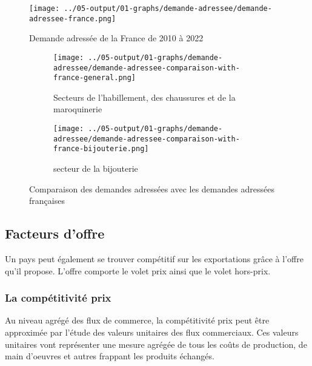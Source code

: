\documentclass[french,10pt,a4paper]{article}
\begin{document}
\begin{figure}[!h]
  \centering  \texttt{[image: ../05-output/01-graphs/demande-adressee/demande-adressee-france.png]}
  \caption{Demande adressée de la France de 2010 à 2022}
  \label{fig:demande-adressee-france}
\end{figure}

\begin{figure}[!h]
  \centering
  \begin{subfigure}{\textwidth}
    \centering    \texttt{[image: ../05-output/01-graphs/demande-adressee/demande-adressee-comparaison-with-france-general.png]}
    \caption{Secteurs de l'habillement, des chaussures et de la maroquinerie}
    \label{fig:demande-adressee-comparaison-with-france-general}
  \end{subfigure}
  \vspace{0.5cm}
  \begin{subfigure}{\textwidth}
    \centering \texttt{[image: ../05-output/01-graphs/demande-adressee/demande-adressee-comparaison-with-france-bijouterie.png]}
 \caption{secteur de la bijouterie}
 \label{fig:demande-adressee-comparaison-with-france-bijouterie}
  \end{subfigure}
  \caption{Comparaison des demandes adressées avec les demandes adressées françaises}
  \label{fig:demande-adressee}
\end{figure}


\subsection{Facteurs d'offre}
Un pays peut également se trouver compétitif sur les exportations grâce à l'offre qu'il propose. L'offre comporte le volet prix ainsi que le volet hors-prix.


\subsubsection{La compétitivité prix}
Au niveau agrégé des flux de commerce, la compétitivité prix peut être approximée par l'étude des valeurs unitaires des flux commerciaux. Ces valeurs unitaires vont représenter une mesure agrégée de tous les coûts de production, de main d'oeuvres et autres frappant les produits échangés.
\end{document}
